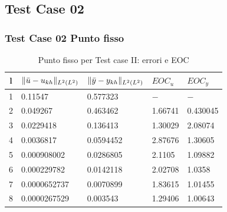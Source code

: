\documentclass{beamer}
\theoremstyle{definition}
\theoremstyle{remark}
\theoremstyle{plain}
\theoremstyle{definition}
\DeclarePairedDelimiter{\norma}{\lVert}{\rVert}
\begin{document}
\subsection{Test Case 02}
\begin{frame}
\frametitle{Test Case 02 Punto fisso}

\begin{table}
\caption{Punto fisso per Test case II: errori e EOC }
\label{puntofissoII}
\centering

\begin{tabular}{cllll}
\toprule
{l}           &  {$ \norma{\bar{u}-u_{kh}}_{L^2(L^2)} $} &  {$ \norma{\bar{y}-y_{kh}}_{L^2(L^2)} $} &  {$ EOC_{u} $} &  {$ EOC_y $} \\
\midrule
1            &  0.11547 &  0.577323 &  {$-$} &  {$-$} \\
2            &  0.049267 &  0.463462 &  1.66741 &  0.430045 \\
3            &  0.0229418 &  0.136413 &  1.30029 &  2.08074 \\
4            &  0.0036817 &  0.0594452 &  2.87676 &  1.30605 \\
5            &  0.000908002 &  0.0286805 &  2.1105 &  1.09882 \\
6            &  0.000229782  &  0.0142118 &  2.02708 &  1.0358 \\
7            &  0.0000652737 &  0.0070899 &  1.83615 &  1.01455 \\      
8            &  0.0000267529 &  0.003543 &  1.29406 &  1.00643 \\
\bottomrule
\end{tabular}              

\end{table}


\end{frame}
\end{document}
